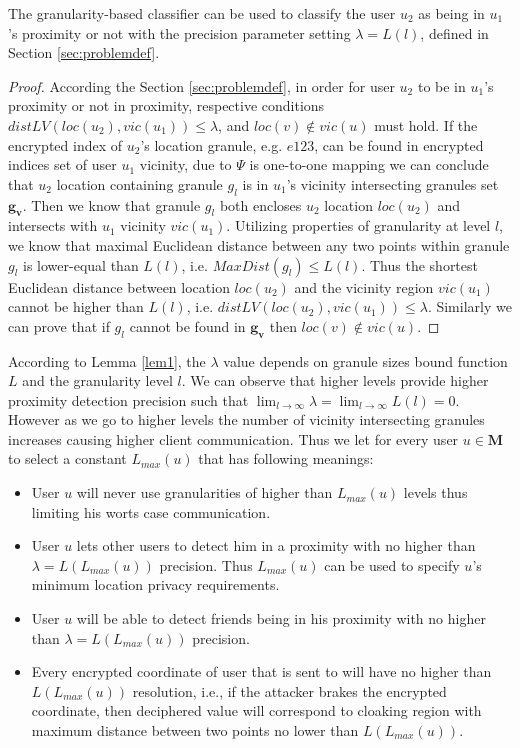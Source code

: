 \begin{lemma}
\label{lem1}
 The granularity-based classifier can be used to classify the user $u_2$ as being
in $u_1$'s proximity or not with the precision parameter setting
$\lambda=L(l)$, defined in Section \ref{sec:problemdef}.
\end{lemma}
\begin{proof}
 According the Section \ref{sec:problemdef}, in order for user $u_2$ to be in
$u_1$'s proximity or not in proximity, respective conditions
$distLV(loc(u_2),vic(u_1)) \leq \lambda$, and $loc(v) \notin vic(u)$ must hold.
If the encrypted index of $u_2$'s location granule, e.g. $e123$, can be found in
encrypted indices set of user $u_1$ vicinity, due to $\Psi$ is one-to-one
mapping we can conclude that $u_2$ location containing granule $g_l$ is in
$u_1$'s vicinity intersecting granules set $\mathbf{g_v}$. Then we know
that granule $g_l$ both encloses $u_2$ location $loc(u_2)$ and intersects with
$u_1$ vicinity $vic(u_1)$. Utilizing properties of granularity at level $l$,
we know that maximal Euclidean distance between any two points within granule
$g_l$ is lower-equal than $L(l)$, i.e. $MaxDist(g_l) \leq L(l)$. Thus the shortest
Euclidean distance between location $loc(u_2)$ and the vicinity region
$vic(u_1)$ cannot be higher than $L(l)$, i.e. $distLV(loc(u_2),vic(u_1)) \leq
\lambda$. Similarly we can prove that if $g_l$ cannot be found in
$\mathbf{g_v}$ then $loc(v) \notin vic(u)$.
\end{proof}

According to Lemma \ref{lem1}, the $\lambda$ value depends on granule sizes
bound function $L$ and the granularity level $l$. We can observe that higher
levels provide higher proximity detection precision such that $\lim_{l
\to \infty} \lambda = \lim_{l \to \infty} L(l) = 0$. However as we go to
higher levels the number of
vicinity intersecting granules increases causing higher client
communication. Thus we let for every user $u \in \mathbf{M}$ to select a
constant $L_{max}(u)$ that has following meanings:
\begin{itemize}
 \item User $u$ will never use granularities of higher than
$L_{max}(u)$ levels thus limiting his worts case communication.
 \item User $u$ lets other users to detect him in a proximity with no higher
than $\lambda=L(L_{max}(u))$ precision. Thus $L_{max}(u)$ can be used to 
specify $u$'s minimum location privacy requirements.
 \item User $u$ will be able to detect friends being in his proximity with no
higher than $\lambda=L(L_{max}(u))$ precision.
 \item Every encrypted coordinate of user that is sent to \ls will have no
higher than $L(L_{max}(u))$ resolution, i.e., if the attacker brakes
the encrypted coordinate, then deciphered value will correspond
to cloaking region with maximum distance between two points no lower than
$L(L_{max}(u))$.
\end{itemize}

